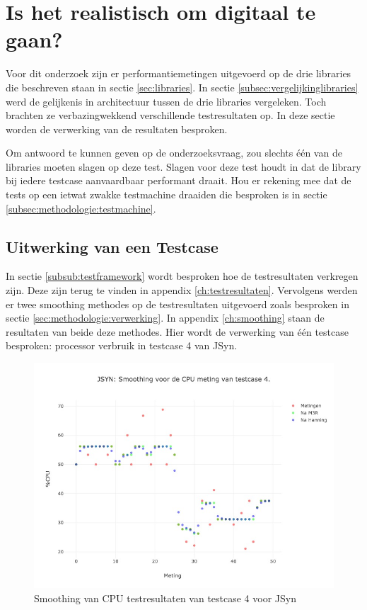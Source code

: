 \section{Is het realistisch om digitaal te gaan?}

Voor dit onderzoek zijn er performantiemetingen uitgevoerd op de drie libraries die beschreven staan in sectie \ref{sec:libraries}. In sectie \ref{subsec:vergelijkinglibraries} werd de gelijkenis in architectuur tussen de drie libraries vergeleken. Toch brachten ze verbazingwekkend verschillende testresultaten op. In deze sectie worden de verwerking van de resultaten besproken. 

Om antwoord te kunnen geven op de onderzoeksvraag, zou slechts één van de libraries moeten slagen op deze test. Slagen voor deze test houdt in dat de library bij iedere testcase aanvaardbaar performant draait. Hou er rekening mee dat de tests op een ietwat zwakke testmachine draaiden die besproken is in sectie \ref{subsec:methodologie:testmachine}.

\subsection{Uitwerking van een Testcase}
\label{calctestcase}

In sectie \ref{subsub:testframework} wordt besproken hoe de testresultaten verkregen zijn. Deze zijn terug te vinden in appendix \ref{ch:testresultaten}. Vervolgens werden er twee smoothing methodes op de testresultaten uitgevoerd zoals besproken in sectie \ref{sec:methodologie:verwerking}. In appendix \ref{ch:smoothing} staan de resultaten van beide deze methodes. Hier wordt de verwerking van één testcase besproken: processor verbruik in testcase 4 van JSyn.

\begin{figure}
    		\centering
    		\includegraphics[width=0.75\linewidth]{medians/jsyn_cpu_4}
    		\caption{Smoothing van CPU testresultaten van testcase 4  voor JSyn}
    		\label{jsyn_cpu_4}
\end{figure}

